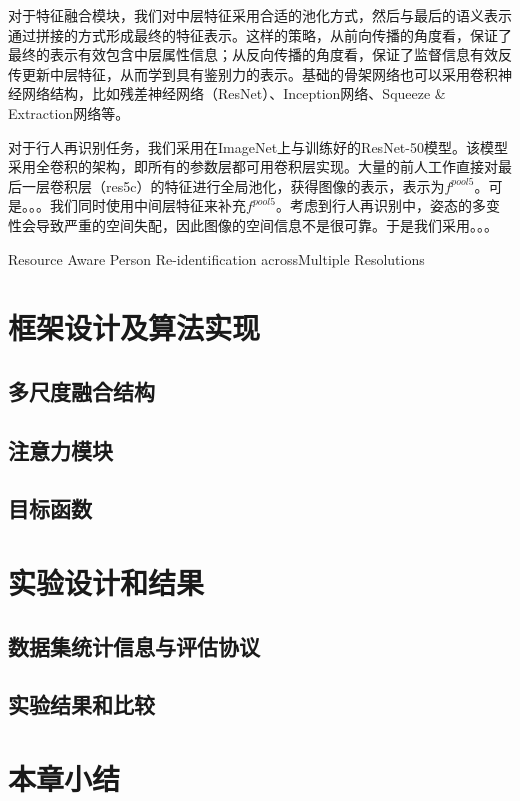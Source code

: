 对于特征融合模块，我们对中层特征采用合适的池化方式，然后与最后的语义表示通过拼接的方式形成最终的特征表示。这样的策略，从前向传播的角度看，保证了最终的表示有效包含中层属性信息；从反向传播的角度看，保证了监督信息有效反传更新中层特征，从而学到具有鉴别力的表示。基础的骨架网络也可以采用卷积神经网络结构，比如残差神经网络（ResNet）、Inception网络、Squeeze \& Extraction网络\misscite 等。

对于行人再识别任务，我们采用在ImageNet上与训练好的ResNet-50模型。该模型采用全卷积的架构，即所有的参数层都可用卷积层实现。大量的前人工作直接对最后一层卷积层（res5c）的特征进行全局池化，获得图像的表示，表示为$f^{pool5}$。可是。。。我们同时使用中间层特征来补充$f^{pool5}$。考虑到行人再识别中，姿态的多变性会导致严重的空间失配，因此图像的空间信息不是很可靠。于是我们采用。。。

\misscite Resource Aware Person Re-identification acrossMultiple Resolutions 


\section{框架设计及算法实现}


\subsection{多尺度融合结构}

\subsection{注意力模块}

\subsection{目标函数}

\section{实验设计和结果}

\subsection{数据集统计信息与评估协议}

\subsection{实验结果和比较}

\section{本章小结}


